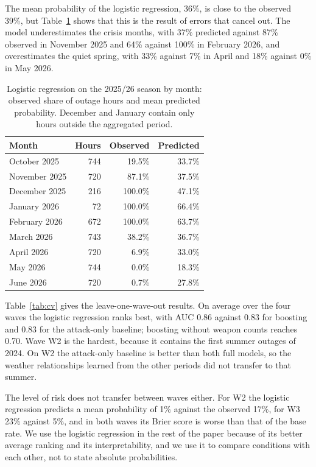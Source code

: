 \documentclass[9pt,twocolumn,letterpaper]{extarticle}
\begin{document}
The mean probability of the logistic regression, 36\%, is close to the observed 39\%, but Table~\ref{tab:calib} shows that this is the result of errors that cancel out. The model underestimates the crisis months, with 37\% predicted against 87\% observed in November 2025 and 64\% against 100\% in February 2026, and overestimates the quiet spring, with 33\% against 7\% in April and 18\% against 0\% in May 2026.

\begin{table}[t]
\centering\small
\caption{Logistic regression on the 2025/26 season by month: observed share of outage hours and mean predicted probability. December and January contain only hours outside the aggregated period.}
\label{tab:calib}
\begin{tabular}{@{}lrrr@{}}
\toprule
Month & Hours & Observed & Predicted \\
\midrule
October 2025 & 744 & 19.5\% & 33.7\% \\
November 2025 & 720 & 87.1\% & 37.5\% \\
December 2025 & 216 & 100.0\% & 47.1\% \\
January 2026 & 72 & 100.0\% & 66.4\% \\
February 2026 & 672 & 100.0\% & 63.7\% \\
March 2026 & 743 & 38.2\% & 36.7\% \\
April 2026 & 720 & 6.9\% & 33.0\% \\
May 2026 & 744 & 0.0\% & 18.3\% \\
June 2026 & 720 & 0.7\% & 27.8\% \\
\bottomrule
\end{tabular}
\end{table}

Table~\ref{tab:cv} gives the leave-one-wave-out results. On average over the four waves the logistic regression ranks best, with AUC 0.86 against 0.83 for boosting and 0.83 for the attack-only baseline; boosting without weapon counts reaches 0.70. Wave W2 is the hardest, because it contains the first summer outages of 2024. On W2 the attack-only baseline is better than both full models, so the weather relationships learned from the other periods did not transfer to that summer.

The level of risk does not transfer between waves either. For W2 the logistic regression predicts a mean probability of 1\% against the observed 17\%, for W3 23\% against 5\%, and in both waves its Brier score is worse than that of the base rate. We use the logistic regression in the rest of the paper because of its better average ranking and its interpretability, and we use it to compare conditions with each other, not to state absolute probabilities.
\end{document}
